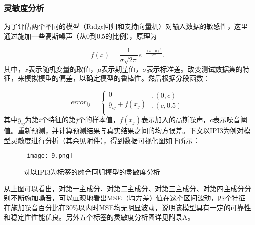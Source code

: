 \subsubsection{灵敏度分析}

为了评估两个不同的模型（Ridge回归和支持向量机）对输入数据的敏感性，这里通过施加一些高斯噪声（从0到0.5的比例），原理为

\begin{equation}
	f\left( x \right)=\frac{1}{\sigma \sqrt{2\pi }}{{e}^{-\frac{{{\left( x-\mu  \right)}^{2}}}{2{{\sigma }^{2}}}}}.
\end{equation}
其中，$x$表示随机变量的取值，$\mu$表示期望值，$\sigma$表示标准差。改变测试数据集的特征，来模拟模型的偏差，以确定模型的鲁棒性。然后根据分段函数：

\begin{equation}
	erro{{r}_{ij}}=\left\{ \begin{matrix}
		0  \\
		{{\overline{y}}_{ij}}+f({{x}_{j}})  \\
	\end{matrix} \right.\begin{matrix}
		,\left( 0,c \right)  \\
		,\left( c,0.5 \right)  \\
	\end{matrix}
\end{equation}
其中$\overline{y}_{ij}$为第$i$个特征的第$j$个的样本值，$f({{x}_{j}})$表示加入的高斯噪声，$c$表示噪音阈值。重新预测，并计算预测结果与真实结果之间的均方误差。下文以IPI3为例对模型灵敏度进行分析（其余见附件），得到数据可视化图如下所示：

\begin{figure}[H] %
	\centering %
	\texttt{[image: 9.png]} 
	\caption{对以IPI3为标签的融合回归模型的灵敏度分析} 
	\label{Fig.main9} 
\end{figure}

从上图可以看出，对第一主成分、对第二主成分、对第三主成分、对第四主成分分别不断施加噪音，可以直观地看出MSE（均方差）值在这个区间波动，四个特征在施加噪音百分比在30\%以内时MSE均无明显波动，说明该模型具有一定的可靠性和稳定性性能优良。另外五个标签的灵敏度分析图详见附录A。

